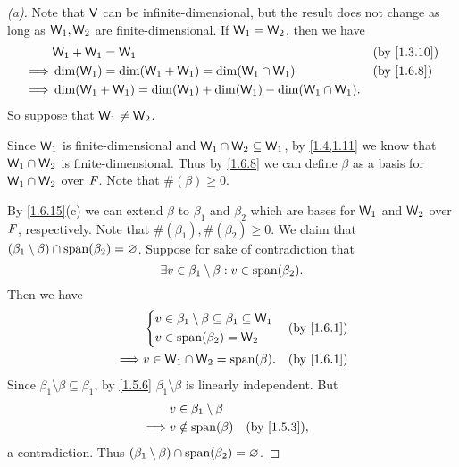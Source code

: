 \begin{proof}[(a)]
  Note that \(\mathsf{V}\) can be infinite-dimensional, but the result does not change as long as \(\mathsf{W}_1, \mathsf{W}_2\) are finite-dimensional.
  If \(\mathsf{W}_1 = \mathsf{W}_2\), then we have
  \begin{align*}
             & \W_1 + \W_1 = \W_1                                                  &  & \by{1.3.10} \\
    \implies & \dim(\W_1) = \dim(\W_1 + \W_1) = \dim(\W_1 \cap \W_1)               &  & \by{1.6.8}  \\
    \implies & \dim(\W_1 + \W_1) = \dim(\W_1) + \dim(\W_1) - \dim(\W_1 \cap \W_1).
  \end{align*}
  So suppose that \(\mathsf{W}_1 \neq \mathsf{W}_2\).

  Since \(\mathsf{W}_1\) is finite-dimensional and \(\mathsf{W}_1 \cap \mathsf{W}_2 \subseteq \mathsf{W}_1\), by \cref{1.4,1.11} we know that \(\mathsf{W}_1 \cap \mathsf{W}_2\) is finite-dimensional.
  Thus by \cref{1.6.8} we can define \(\beta\) as a basis for \(\mathsf{W}_1 \cap \mathsf{W}_2\) over \(\mathit{F}\).
  Note that \(\#(\beta) \geq 0\).

  By \cref{1.6.15}(c) we can extend \(\beta\) to \(\beta_1\) and \(\beta_2\) which are bases for \(\mathsf{W}_1\) and \(\mathsf{W}_2\) over \(\mathit{F}\), respectively.
  Note that \(\#(\beta_1), \#(\beta_2) \geq 0\).
  We claim that \((\beta_1 \setminus \beta) \cap \spn{\beta_2} = \varnothing\).
  Suppose for sake of contradiction that
  \[
    \exists v \in \beta_1 \setminus \beta : v \in \spn{\beta_2}.
  \]
  Then we have
  \begin{align*}
             & \begin{dcases}
                 v \in \beta_1 \setminus \beta \subseteq \beta_1 \subseteq \W_1 \\
                 v \in \spn{\beta_2} = \W_2
               \end{dcases} &  & \by{1.6.1}                    \\
    \implies & v \in \W_1 \cap \W_2 = \spn{\beta}.                               &  & \by{1.6.1}
  \end{align*}
  Since \(\beta_1 \setminus \beta \subseteq \beta_1\), by \cref{1.5.6} \(\beta_1 \setminus \beta\) is linearly independent.
  But
  \begin{align*}
             & v \in \beta_1 \setminus \beta                  \\
    \implies & v \notin \spn{\beta}          &  & \by{1.5.3},
  \end{align*}
  a contradiction.
  Thus \((\beta_1 \setminus \beta) \cap \spn{\beta_2} = \varnothing\).


\end{proof}
